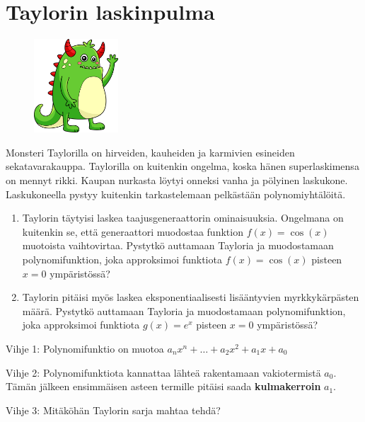\clearpage

\section{Taylorin laskinpulma}

\begin{figure}
    \begin{center}
    \includegraphics[width=0.28\textwidth]{kuvat/taylor_monsteri.jpg}
    \end{center}
\end{figure}

Monsteri Taylorilla on hirveiden, kauheiden ja karmivien esineiden sekatavarakauppa. Taylorilla on kuitenkin ongelma, koska hänen superlaskimensa on mennyt rikki. Kaupan nurkasta löytyi onneksi vanha ja pölyinen laskukone. Laskukoneella pystyy kuitenkin tarkastelemaan pelkästään polynomiyhtälöitä. 

\begin{enumerate}
\item Taylorin täytyisi laskea taajusgeneraattorin ominaisuuksia. Ongelmana on kuitenkin se, että generaattori muodostaa funktion $f(x) = \cos(x)$ muotoista vaihtovirtaa. Pystytkö auttamaan Tayloria ja muodostamaan polynomifunktion, joka approksimoi funktiota $f(x) = \cos(x)$ pisteen $x = 0$ ympäristössä?

\item Taylorin pitäisi myös laskea eksponentiaalisesti lisääntyvien myrkkykärpästen määrä. Pystytkö auttamaan Tayloria ja muodostamaan polynomifunktion, joka approksimoi funktiota $g(x) = e^x$ pisteen $x = 0$ ympäristössä?
\end{enumerate}

Vihje 1: Polynomifunktio on muotoa $a_nx^n+\ldots+a_2x^2+a_1x+a_0$

Vihje 2: Polynomifunktiota kannattaa lähteä rakentamaan vakiotermistä $a_0$. Tämän jälkeen ensimmäisen asteen termille pitäisi saada \textbf{kulmakerroin} $a_1$.


Vihje 3: Mitäköhän Taylorin sarja mahtaa tehdä?